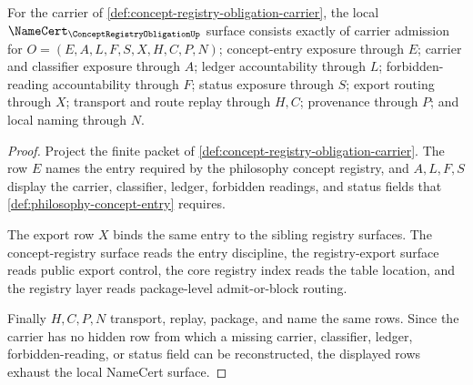 \begin{theorem}
\label{thm:concept-registry-obligation-namecert-obligations}
For the carrier of \autoref{def:concept-registry-obligation-carrier}, the local $\NameCert_{\ConceptRegistryObligationUp}$ surface consists exactly of carrier admission for $O=(E,A,L,F,S,X,H,C,P,N)$; concept-entry exposure through $E$; carrier and classifier exposure through $A$; ledger accountability through $L$; forbidden-reading accountability through $F$; status exposure through $S$; export routing through $X$; transport and route replay through $H,C$; provenance through $P$; and local naming through $N$.
\end{theorem}
\begin{proof}
Project the finite packet of \autoref{def:concept-registry-obligation-carrier}. The row $E$ names the entry required by the philosophy concept registry, and $A,L,F,S$ display the carrier, classifier, ledger, forbidden readings, and status fields that \autoref{def:philosophy-concept-entry} requires.

The export row $X$ binds the same entry to the sibling registry surfaces. The concept-registry surface reads the entry discipline, the registry-export surface reads public export control, the core registry index reads the table location, and the registry layer reads package-level admit-or-block routing.

Finally $H,C,P,N$ transport, replay, package, and name the same rows. Since the carrier has no hidden row from which a missing carrier, classifier, ledger, forbidden-reading, or status field can be reconstructed, the displayed rows exhaust the local NameCert surface.
\end{proof}

